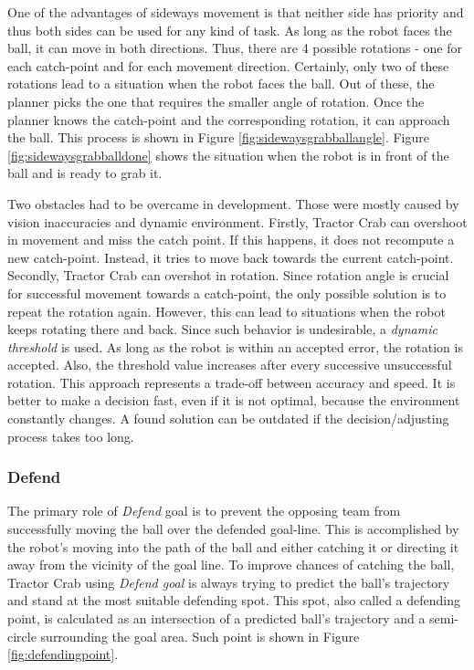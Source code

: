 One of the advantages of sideways movement is that neither side has priority
and thus both sides can be used for any kind of task. As long as the robot
faces the ball, it can move in both directions. Thus, there are 4 possible
rotations - one for each catch-point and for each movement direction.
Certainly, only two of these rotations lead to a situation when the robot faces
the ball. Out of these, the planner picks the one that requires the smaller
angle of rotation. Once the planner knows the catch-point and the corresponding
rotation, it can approach the ball. This process is shown in Figure
\ref{fig:sidewaysgrabballangle}. Figure \ref{fig:sidewaysgrabballdone} shows
the situation when the robot is in front of the ball and is ready to grab it.

Two obstacles had to be overcame in development. Those were mostly caused by
vision inaccuracies and dynamic environment. Firstly, Tractor Crab can
overshoot in movement and miss the catch point. If this happens, it does not
recompute a new catch-point. Instead, it tries to move back towards the current
catch-point. Secondly, Tractor Crab can overshot in rotation. Since rotation
angle is crucial for successful movement towards a catch-point, the only
possible solution is to repeat the rotation again. However, this can lead to
situations when the robot keeps rotating there and back. Since such behavior is
undesirable, a \emph{dynamic threshold} is used. As long as the robot is within
an accepted error, the rotation is accepted. Also, the threshold value
increases after every successive unsuccessful rotation. This approach
represents a trade-off between accuracy and speed. It is better to make a
decision fast, even if it is not optimal, because the environment constantly
changes. A found solution can be outdated if the decision/adjusting process
takes too long.

\subsubsection{Defend}

The primary role of \emph{Defend} goal is to prevent the opposing team from successfully moving the ball over the defended goal-line. This is accomplished by the robot's moving into the path of the ball and either catching it or directing it away from the vicinity of the goal line. To improve chances of catching the ball, Tractor Crab using \emph{Defend goal} is always trying to predict the ball's trajectory and stand at the most suitable defending spot. This spot, also called a defending point, is calculated as an intersection of  a predicted ball's trajectory and a semi-circle surrounding the goal area. Such point is shown in Figure \ref{fig:defendingpoint}.

